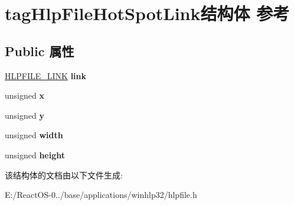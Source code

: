 \hypertarget{structtag_hlp_file_hot_spot_link}{}\section{tag\+Hlp\+File\+Hot\+Spot\+Link结构体 参考}
\label{structtag_hlp_file_hot_spot_link}
\subsection*{Public 属性}
\begin{DoxyCompactItemize}
\item 
\mbox{\label{structtag_hlp_file_hot_spot_link_a9c8ce8c7d76b618e7b35f349229afa69}} 
\hyperlink{structtag_hlp_file_link}{H\+L\+P\+F\+I\+L\+E\+\_\+\+L\+I\+NK} {\bfseries link}
\item 
\mbox{\label{structtag_hlp_file_hot_spot_link_a99f9c678d7bd82d196bdc519b8dd293c}} 
unsigned {\bfseries x}
\item 
\mbox{\label{structtag_hlp_file_hot_spot_link_ac40fa54b7927a0e6cb263c20f83ea162}} 
unsigned {\bfseries y}
\item 
\mbox{\label{structtag_hlp_file_hot_spot_link_af41f164a8c292bd76d78f54d04bcd256}} 
unsigned {\bfseries width}
\item 
\mbox{\label{structtag_hlp_file_hot_spot_link_a00b3a66d398e52529f546b0741dc8299}} 
unsigned {\bfseries height}
\end{DoxyCompactItemize}


该结构体的文档由以下文件生成\+:\begin{DoxyCompactItemize}
\item 
E\+:/\+React\+O\+S-\/0../base/applications/winhlp32/hlpfile.\+h\end{DoxyCompactItemize}

